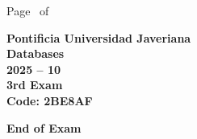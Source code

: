 \documentclass[11pt, addpoints]{exam}\usepackage[utf8]{inputenc}
\begin{document}
\begin{coverpages}
\begin{center}
			\vspace{3mm}
			\leavevmode \hspace{5mm} 
		\end{center}
	\end{coverpages}

	\footer{} {Page \thepage\ of \numpages} {}

	\centering
	\textbf{\Large Pontificia Universidad Javeriana}\\
	\textbf{\Large Databases} \\
	\textbf{\large 2025 -- 10} \\
	\textbf{\large 3rd Exam} \\
	\textbf{Code: 2BE8AF}


	\begin{questions}
		
		
		
		
		
		
		
		
		
		
		
		
		
		
		
		
		
		
		
		
	\end{questions}

	\vspace{5mm}
	\noindent \textbf{End of Exam}
\end{document}
